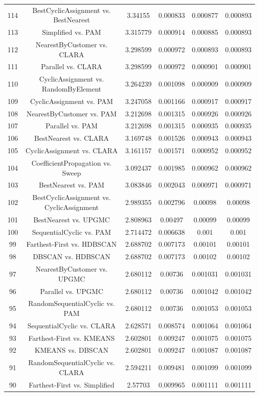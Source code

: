 \documentclass[a4paper,10pt]{article}
\begin{document}
\begin{landscape}
\begin{table}[!htp]
\begin{tabular}{cccccc}
114&BestCyclicAssignment vs. BestNearest&3.34155&0.000833&0.000877&0.000893\\
113&Simplified vs. PAM&3.315779&0.000914&0.000885&0.000893\\
112&NearestByCustomer vs. CLARA&3.298599&0.000972&0.000893&0.000893\\
111&Parallel vs. CLARA&3.298599&0.000972&0.000901&0.000901\\
110&CyclicAssignment vs. RandomByElement&3.264239&0.001098&0.000909&0.000909\\
109&CyclicAssignment vs. PAM&3.247058&0.001166&0.000917&0.000917\\
108&NearestByCustomer vs. PAM&3.212698&0.001315&0.000926&0.000926\\
107&Parallel vs. PAM&3.212698&0.001315&0.000935&0.000935\\
106&BestNearest vs. CLARA&3.169748&0.001526&0.000943&0.000943\\
105&CyclicAssignment vs. CLARA&3.161157&0.001571&0.000952&0.000952\\
104&CoefficientPropagation vs. Sweep&3.092437&0.001985&0.000962&0.000962\\
103&BestNearest vs. PAM&3.083846&0.002043&0.000971&0.000971\\
102&BestCyclicAssignment vs. CyclicAssignment&2.989355&0.002796&0.00098&0.00098\\
101&BestNearest vs. UPGMC&2.808963&0.00497&0.00099&0.00099\\
100&SequentialCyclic vs. PAM&2.714472&0.006638&0.001&0.001\\
99&Farthest-First vs. HDBSCAN&2.688702&0.007173&0.00101&0.00101\\
98&DBSCAN vs. HDBSCAN&2.688702&0.007173&0.00102&0.00102\\
97&NearestByCustomer vs. UPGMC&2.680112&0.00736&0.001031&0.001031\\
96&Parallel vs. UPGMC&2.680112&0.00736&0.001042&0.001042\\
95&RandomSequentialCyclic vs. PAM&2.680112&0.00736&0.001053&0.001053\\
94&SequentialCyclic vs. CLARA&2.628571&0.008574&0.001064&0.001064\\
93&Farthest-First vs. KMEANS&2.602801&0.009247&0.001075&0.001075\\
92&KMEANS vs. DBSCAN&2.602801&0.009247&0.001087&0.001087\\
91&RandomSequentialCyclic vs. CLARA&2.594211&0.009481&0.001099&0.001099\\
90&Farthest-First vs. Simplified&2.57703&0.009965&0.001111&0.001111\\

\end{tabular}
\end{table}
\end{landscape}
\end{document}
